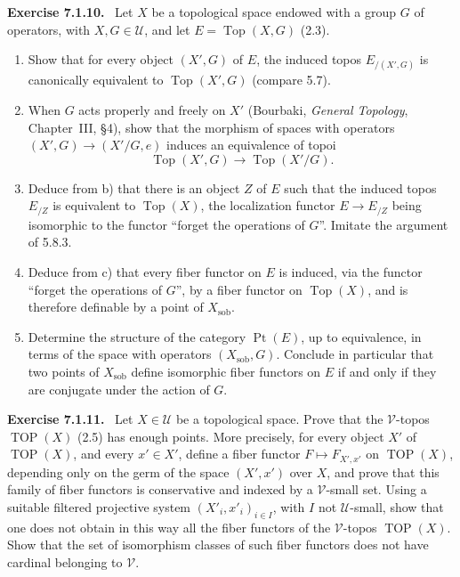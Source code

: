 \documentclass[11pt]{article}
\newcommand{\U}{\mathcal{U}}
\newcommand{\V}{\mathcal{V}}
\newcommand{\Top}{\operatorname{Top}}
\newcommand{\TOP}{\operatorname{TOP}}
\newcommand{\Ppoint}{\operatorname{Pt}}
\newcommand{\sob}{\operatorname{sob}}
\newenvironment{remarktext}[1]{\par\medskip\noindent\textbf{#1.}\ }{\par\medskip}
\begin{document}
\begin{remarktext}{Exercise 7.1.10}
Let \(X\) be a topological space endowed with a group \(G\) of operators, with \(X,G\in\U\), and let \(E=\Top(X,G)\) (2.3).
\begin{enumerate}[label=\alph*)]
\item Show that for every object \((X',G)\) of \(E\), the induced topos \(E_{/(X',G)}\) is canonically equivalent to \(\Top(X',G)\) (compare 5.7).
\item When \(G\) acts properly and freely on \(X'\) (Bourbaki, \emph{General Topology}, Chapter~III, \S4), show that the morphism of spaces with operators \((X',G)\to (X'/G,e)\) induces an equivalence of topoi
\[
\Top(X',G)\longrightarrow\Top(X'/G).
\]
\item Deduce from b) that there is an object \(Z\) of \(E\) such that the induced topos \(E_{/Z}\) is equivalent to \(\Top(X)\), the localization functor \(E\to E_{/Z}\) being isomorphic to the functor ``forget the operations of \(G\)''. Imitate the argument of 5.8.3.
\item Deduce from c) that every fiber functor on \(E\) is induced, via the functor ``forget the operations of \(G\)'', by a fiber functor on \(\Top(X)\), and is therefore definable by a point of \(X_{\sob}\).
\item Determine the structure of the category \(\Ppoint(E)\), up to equivalence, in terms of the space with operators \((X_{\sob},G)\). Conclude in particular that two points of \(X_{\sob}\) define isomorphic fiber functors on \(E\) if and only if they are conjugate under the action of \(G\).
\end{enumerate}
\end{remarktext}

\begin{remarktext}{Exercise 7.1.11}
Let \(X\in\U\) be a topological space. Prove that the \(\V\)-topos \(\TOP(X)\) (2.5) has enough points. More precisely, for every object \(X'\) of \(\TOP(X)\), and every \(x'\in X'\), define a fiber functor \(F\mapsto F_{X',x'}\) on \(\TOP(X)\), depending only on the germ of the space \((X',x')\) over \(X\), and prove that this family of fiber functors is conservative and indexed by a \(\V\)-small set. Using a suitable filtered projective system \((X'_i,x'_i)_{i\in I}\), with \(I\) not \(\U\)-small, show that one does not obtain in this way all the fiber functors of the \(\V\)-topos \(\TOP(X)\). Show that the set of isomorphism classes of such fiber functors does not have cardinal belonging to \(\V\).
\end{remarktext}
\end{document}
